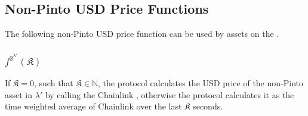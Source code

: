 \documentclass[class=article, crop=false]{standalone}
\begin{document}

\subsection{Non-Pinto USD Price Functions}

The following non-Pinto USD price function can be used by assets on the .


\subsubsection{$f^{\$^{\lambda'}}(\mathfrak{K})$}

If $\mathfrak{K} = 0$, such that $\mathfrak{K} \in \mathbb{N}$, the protocol calculates the USD price of the non-Pinto asset in $\lambda'$ by calling the Chainlink , otherwise the protocol calculates it as the time weighted average of Chainlink  over the last $\mathfrak{K}$ seconds. 
\end{document}
